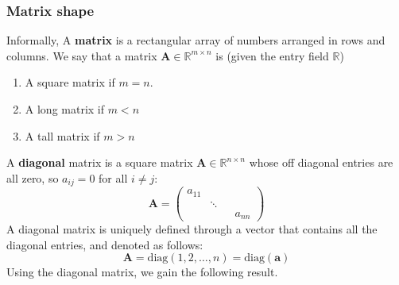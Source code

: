 \subsubsection{Matrix shape}
Informally, A \textbf{matrix} is a rectangular array of numbers arranged in rows and columns. We say that a matrix $\mathbf{A}\in \mathbb{R}^{m\times n}$ is (given the entry field $\mathbb{R}$)
\begin{enumerate}[topsep=1pt,itemsep=1pt]
    \item A square matrix if $m=n$. 
    \item A long matrix if $m<n$
    \item A tall matrix if $m>n$
\end{enumerate}
A \textbf{diagonal} matrix is a square matrix $\mathbf{A}\in \mathbb{R}^{n\times n}$ whose off diagonal entries are all zero, so $a_{ij}=0$ for all $i\neq j$: 
\begin{equation}
    \mathbf{A}=\begin{pmatrix}
a_{11}  &  &  &  \\
 & \ddots  &  &  \\
 &  &  & a_{nn}
\end{pmatrix}
\end{equation}
A diagonal matrix is uniquely defined through a vector that contains all the diagonal entries, and denoted as follows:
\begin{equation}
    \mathbf{A}=\mathrm{diag}(1,2,\dots,n)=\mathrm{diag}(\mathbf{a})
\end{equation}
Using the diagonal matrix, we gain the following result. 
